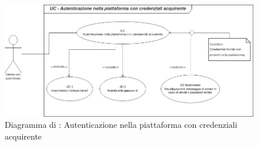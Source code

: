\begin{figure}[H]
	\centering
	\includegraphics[scale=0.6]{Immagini/DiagrammiUC/AccessoAcquirente.png}
	\caption{Diagramma di \actualUC: Autenticazione nella piattaforma con credenziali acquirente} 
	\label{fig:LoginAcquirente}
\end{figure}

